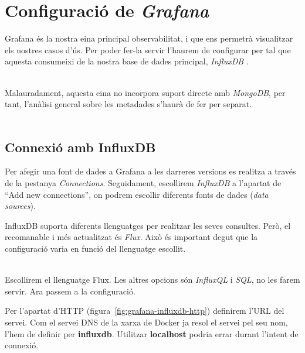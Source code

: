 \chapter{Configuració de \textit{Grafana}}\label{ch:grafana-config}

Grafana és la nostra eina principal observabilitat, i que ens permetrà visualitzar els nostres casos d’ús.
Per poder fer-la servir l’haurem de configurar per tal que aquesta consumeixi de la nostra base de dades principal, \textit{InfluxDB} .

\noindent \\
Malauradament, aquesta eina no incorpora suport directe amb \textit{MongoDB}, per tant, l’anàlisi general sobre les metadades s’haurà de fer per separat. \\ \\

\section*{Connexió amb InfluxDB}\label{sec:influxdb-grafana-connection}

\noindent
Per afegir una font de dades a Grafana a les darreres versions es realitza a través de la pestanya \textit{Connections}.
Seguidament,  escollirem \textit{InfluxDB} a l'apartat de ``Add new connections'', on podrem escollir diferents fonts de dades (\textit{data sources}). \\

\noindent
\begin{tcolorbox}[colback=blue!5!white, colframe=blue!75!black, title=Llenguatge de cerca]
    InfluxDB suporta diferents llenguatges per realitzar les seves consultes.
    Però, el recomanable i més actualitzat és \textit{Flux}.
    Això és important degut que la configuració varia en funció del llenguatge escollit.
\end{tcolorbox}

\noindent \\
Escollirem el llenguatge Flux.
Les altres opcions són \textit{InfluxQL} i \textit{SQL}, no les farem servir.
Ara passem a la configuració.

\clearpage

\noindent
Per l’apartat d’HTTP (figura~\ref{fig:grafana-influxdb-http}) definirem l’\gls{URL} del servei.
Com el servei \gls{DNS} de la xarxa de Docker ja resol el servei pel seu nom, l’hem de definir per \textbf{influxdb}.
Utilitzar \textbf{localhost} podria errar durant l’intent de connexió.

